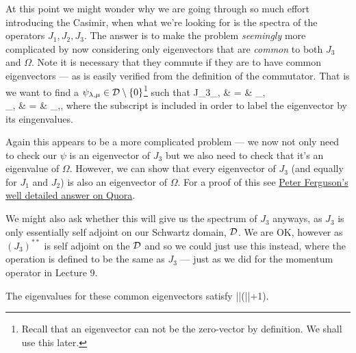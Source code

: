 At this point we might wonder why we are going through so much effort introducing the Casimir, when what we're looking for is the spectra of the operators $J_1,J_2,J_3$. The answer is to make the problem \emph{seemingly} more complicated by now considering only eigenvectors that are \emph{common} to both $J_3$ and $\Omega$. Note it is necessary that they commute if they are to have common eigenvectors --- as is easily verified from the definition of the commutator. That is we want to find a $\psi_{\lambda,\mu}\in\mathcal{D}\setminus\{0\}$\footnote{Recall that an eigenvector can not be the zero-vector by definition. We shall use this later.} such that 
J_3\psi_{\lambda,\mu} & = & \mu \psi_{\lambda,\mu} \\
\Omega\psi_{\lambda,\mu} & = & \lambda \psi_{\lambda,\mu},
\ei 
where the subscript is included in order to label the eigenvector by its eingenvalues.

Again this appears to be a more complicated problem --- we now not only need to check our $\psi$ is an eigenvector of $J_3$ but we also need to check that it's an eigenvalue of $\Omega$. However, we can show that every eigenvector of $J_3$ (and equally for $J_1$ and $J_2$) is also an eigenvector of $\Omega$. For a proof of this see \href{https://www.quora.com/Is-every-eigenvector-of-the-angular-momentum-operator-L_3-also-an-eigenvector-of-the-Casimir-operator-If-so-can-this-be-proven-without-using-the-specific-form-of-L_3-i-e-using-only-commutation-relations-etc}{Peter Ferguson's well detailed answer on Quora}.

We might also ask whether this will give us the spectrum of $J_3$ anyways, as $J_3$ is only essentially self adjoint on our Schwartz domain, $\mathcal{D}$. We are OK, however as $(J_3)^{**}$ is self adjoint on the $\mathcal{D}$ and so we could just use this instead, where the operation is defined to be the same as $J_3$ --- just as we did for the momentum operator in Lecture 9. 

\bl
\label{lem:CommonEigenvalueInequality}
The eigenvalues for these common eigenvectors satisfy 
\bse 
\lambda \geq |\mu|(|\mu|+1).
\ese 
\el

